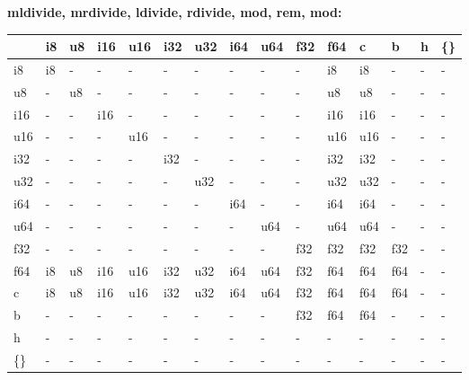 \textbf{mldivide, mrdivide, ldivide, rdivide, mod, rem, mod:}
\begin{scriptsize}\begin{tt}\begin{center}\vspace{-.3cm}\begin{tabular}{|m{.65cm}||m{.65cm}|m{.65cm}|m{.65cm}|m{.65cm}|m{.65cm}|m{.65cm}|m{.65cm}|m{.65cm}|m{.65cm}|m{.65cm}|m{.65cm}|m{.65cm}|m{.65cm}|m{.65cm}|}\hline 
&i8&u8&i16&u16&i32&u32&i64&u64&f32&f64&c&b&h&\{\}\\ \hline \hline
i8&i8&-&-&-&-&-&-&-&-&i8&i8&-&-&-\\ \hline
u8&-&u8&-&-&-&-&-&-&-&u8&u8&-&-&-\\ \hline
i16&-&-&i16&-&-&-&-&-&-&i16&i16&-&-&-\\ \hline
u16&-&-&-&u16&-&-&-&-&-&u16&u16&-&-&-\\ \hline
i32&-&-&-&-&i32&-&-&-&-&i32&i32&-&-&-\\ \hline
u32&-&-&-&-&-&u32&-&-&-&u32&u32&-&-&-\\ \hline
i64&-&-&-&-&-&-&i64&-&-&i64&i64&-&-&-\\ \hline
u64&-&-&-&-&-&-&-&u64&-&u64&u64&-&-&-\\ \hline
f32&-&-&-&-&-&-&-&-&f32&f32&f32&f32&-&-\\ \hline
f64&i8&u8&i16&u16&i32&u32&i64&u64&f32&f64&f64&f64&-&-\\ \hline
c&i8&u8&i16&u16&i32&u32&i64&u64&f32&f64&f64&f64&-&-\\ \hline
b&-&-&-&-&-&-&-&-&f32&f64&f64&-&-&-\\ \hline
h&-&-&-&-&-&-&-&-&-&-&-&-&-&-\\ \hline
\{\}&-&-&-&-&-&-&-&-&-&-&-&-&-&-\\ \hline
\end{tabular}\end{center}\end{tt}\end{scriptsize} 

